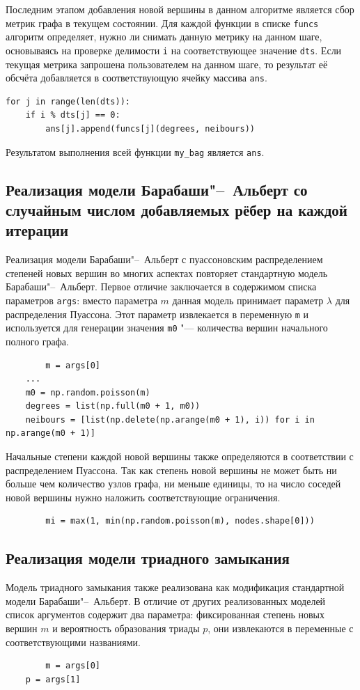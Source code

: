 \documentclass[bachelor, och, diploma]{SCWorks}
\begin{document}
Последним этапом добавления новой вершины в данном алгоритме является сбор метрик графа в текущем состоянии. Для каждой функции в списке \texttt{funcs} алгоритм определяет, нужно ли снимать данную метрику на данном шаге, основываясь на проверке делимости \texttt{i} на соответствующее значение \texttt{dts}. Если текущая метрика запрошена пользователем на данном шаге, то результат её обсчёта добавляется в соответствующую ячейку массива \texttt{ans}. 
\begin{verbatim}
for j in range(len(dts)):
    if i % dts[j] == 0:
        ans[j].append(funcs[j](degrees, neibours))
\end{verbatim}

Результатом выполнения всей функции \texttt{my_bag} является \texttt{ans}.

\subsection{Реализация модели Барабаши"--~Альберт со случайным числом добавляемых рёбер на каждой итерации}
Реализация модели Барабаши"--~Альберт с пуассоновским распределением степеней новых вершин во многих аспектах повторяет стандартную модель Барабаши"--~Альберт. Первое отличие заключается в содержимом списка параметров \texttt{args}: вместо параметра $m$ данная модель принимает параметр $\lambda$ для распределения Пуассона. Этот параметр извлекается в переменную \texttt{m} и используется для генерации значения \texttt{m0} "--- количества вершин начального полного графа. 
\begin{verbatim}
		m = args[0]
    ...
    m0 = np.random.poisson(m)
    degrees = list(np.full(m0 + 1, m0))
    neibours = [list(np.delete(np.arange(m0 + 1), i)) for i in np.arange(m0 + 1)]    
\end{verbatim}

Начальные степени каждой новой вершины также определяются в соответствии с распределением Пуассона. Так как степень новой вершины не может быть ни больше чем количество узлов графа, ни меньше единицы, то на число соседей новой вершины нужно наложить соответствующие ограничения.
\begin{verbatim}
		mi = max(1, min(np.random.poisson(m), nodes.shape[0]))
\end{verbatim}
\subsection{Реализация модели триадного замыкания}
Модель триадного замыкания также реализована как модификация стандартной модели Барабаши"--~Альберт. В отличие от других реализованных моделей список аргументов содержит два параметра: фиксированная степень новых вершин $m$ и вероятность образования триады $p$, они извлекаются в переменные с соответствующими названиями.
\begin{verbatim}
		m = args[0]
    p = args[1]
\end{verbatim}
\end{document}
